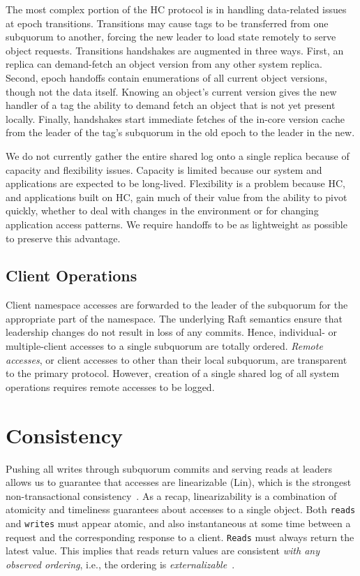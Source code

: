 The most complex portion of the HC protocol is in handling data-related issues at epoch transitions.
Transitions may cause tags to be transferred from one subquorum to another, forcing the new leader to load state remotely to serve object requests.
Transitions handshakes are augmented in three ways.
First, an replica can demand-fetch an object version from any other system replica.
Second, epoch handoffs contain enumerations of all current object versions, though not the data itself.
Knowing an object's current version gives the new handler of a tag the ability to demand fetch an object that is not yet present locally.
Finally, handshakes start immediate fetches of the in-core version cache from the leader of the tag's subquorum in the old epoch to the leader in the new.

We do not currently gather the entire shared log onto a single replica because of capacity and flexibility issues.
Capacity is limited because our system and applications are expected to be long-lived.
Flexibility is a problem because HC, and applications built on HC, gain much of their value from the ability to pivot quickly, whether to deal with changes in the environment or for changing application access patterns.
We require handoffs to be as lightweight as possible to preserve this advantage.

\subsection{Client Operations}
\label{ch03_client_operations}


Client namespace accesses are forwarded to the leader of the subquorum for the appropriate part of the namespace.
The underlying Raft semantics ensure that leadership changes do not result in loss of any commits.
Hence, individual- or multiple-client accesses to a single subquorum are totally ordered.
\emph{Remote accesses}, or client accesses to other than their local subquorum, are transparent to the primary protocol.
However, creation of a single shared log of all system operations requires remote accesses to be logged.

\section{Consistency}
\label{ch03_consistency}

Pushing all writes through subquorum commits and serving reads at leaders allows us to guarantee that accesses are linearizable (Lin), which is the strongest non-transactional consistency~\cite{linearizability,sequential_consistency}.
As a recap, linearizability is a combination of atomicity and timeliness guarantees about accesses to a single object.
Both \texttt{reads} and \texttt{writes} must appear atomic, and also instantaneous at some time between a request and the corresponding response to a client.
\texttt{Reads} must always return the latest value.
This implies that reads return values are consistent \emph{with any observed ordering}, i.e., the ordering is \emph{externalizable}~\cite{externalizable}.

